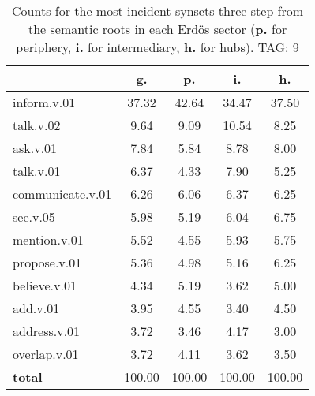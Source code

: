 \begin{table}[h!]
\begin{center}
\begin{tabular}{| l || c | c | c | c |}\hline
 & {\bf g.} & {\bf p.} & {\bf i.} & {\bf h.} \\\hline\hline
inform.v.01 & 37.32  & 42.64  & 34.47  & 37.50 \\\hline
talk.v.02 & 9.64  & 9.09  & 10.54  & 8.25 \\\hline
ask.v.01 & 7.84  & 5.84  & 8.78  & 8.00 \\\hline
talk.v.01 & 6.37  & 4.33  & 7.90  & 5.25 \\\hline
communicate.v.01 & 6.26  & 6.06  & 6.37  & 6.25 \\\hline
see.v.05 & 5.98  & 5.19  & 6.04  & 6.75 \\\hline
mention.v.01 & 5.52  & 4.55  & 5.93  & 5.75 \\\hline
propose.v.01 & 5.36  & 4.98  & 5.16  & 6.25 \\\hline
believe.v.01 & 4.34  & 5.19  & 3.62  & 5.00 \\\hline
add.v.01 & 3.95  & 4.55  & 3.40  & 4.50 \\\hline
address.v.01 & 3.72  & 3.46  & 4.17  & 3.00 \\\hline
overlap.v.01 & 3.72  & 4.11  & 3.62  & 3.50 \\\hline\hline
{{\bf total}} & 100.00  & 100.00  & 100.00  & 100.00 \\\hline
\end{tabular}
\caption{Counts for the most incident synsets three step from the semantic roots in each Erd\"os sector ({\bf p.} for periphery, {\bf i.} for intermediary, {\bf h.} for hubs). TAG: 9}
\end{center}
\end{table}